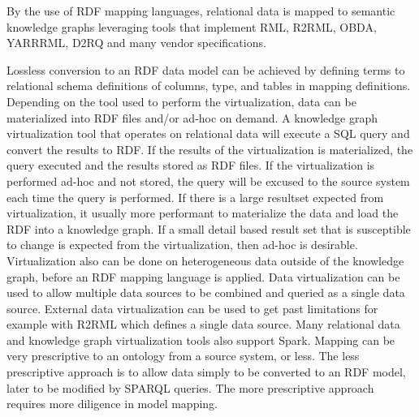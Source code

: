 By the use of RDF mapping languages, relational data is mapped to semantic knowledge graphs leveraging tools that
implement RML, R2RML, OBDA, YARRRML,
D2RQ and many vendor specifications.

Lossless conversion to an RDF data model can be achieved by defining terms to relational schema
definitions of columns, type, and tables in mapping definitions.
Depending on the tool used to perform the virtualization,
data can be materialized into RDF files and/or ad-hoc on demand.
A knowledge graph virtualization tool that operates on relational data will execute a SQL query and
convert the results to RDF.
If the results of the virtualization is materialized, the query executed and the results stored as RDF files.
If the virtualization is performed ad-hoc and not stored, the query will be excused to the source system each
time the query is performed.
If there is a large resultset expected from virtualization,
it usually more performant to materialize the data and load the RDF into a knowledge graph.
If a small detail based result set that  is susceptible to change is expected from the virtualization,
then ad-hoc is desirable.
Virtualization also can be done on heterogeneous data outside of the knowledge graph,
before an RDF mapping language is applied.
Data virtualization can be used to allow multiple data sources to be combined and queried as a single data source.
External data virtualization can be used to get past limitations for example with R2RML which defines a
single data source.
Many relational data and knowledge graph virtualization tools also support Spark.
Mapping can be very prescriptive to an ontology from a source system, or less.
The less prescriptive approach is to allow data simply to be converted to an RDF model,
later to be modified by SPARQL queries.
The more prescriptive approach requires more diligence in model mapping.

